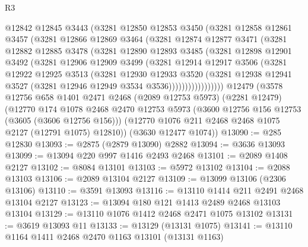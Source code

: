 \begin{lexlean}{R3}
\begin{coremodule}
            @12842
            @12845
            @3443
            (@3281
              @12850
              @12853
              @3450
              (@3281
                @12858
                @12861
                @3457
                (@3281
                  @12866
                  @12869
                  @3464
                  (@3281
                    @12874
                    @12877
                    @3471
                    (@3281
                      @12882
                      @12885
                      @3478
                      (@3281
                        @12890
                        @12893
                        @3485
                        (@3281
                          @12898
                          @12901
                          @3492
                          (@3281
                            @12906
                            @12909
                            @3499
                            (@3281
                              @12914
                              @12917
                              @3506
                              (@3281
                                @12922
                                @12925
                                @3513
                                (@3281
                                  @12930
                                  @12933
                                  @3520
                                  (@3281
                                    @12938
                                    @12941
                                    @3527
                                    (@3281 @12946 @12949 @3534 @3536)))))))))))))))))
    @12479
    (@3578
      @12756
      @658
      @1401
      @2471
      @2468
      (@2089 @12753 @5973)
      (@2281 @12479)
      (@12770
        @174
        @1078
        @2468
        @2470
        @12753
        @5973
        (@3600 @12756 @156 @12753 (@3605 (@3606 @12756 @156)))
        (@12770 @1076 @211 @2468 @2468 @1075 @2127 (@12791 @1075) @12810))
      (@3630 @12477 @1074))
@13090 := @285 @12830
@13093 := @2875 (@2879 @13090) @2882
@13094 := @3636 @13093
@13099 := @13094 @220 @997 @1416 @2493 @2468
@13101 := @2089 @1408 @2127
@13102 := @8084 @13101
@13103 := @5972 @13102
@13104 := @2088 @13103
@13106 := @2089 @13104 @2127
@13109 := @13099 @13106 (@2306 @13106)
@13110 := @3591 @13093
@13116 := @13110 @1414 @211 @2491 @2468 @13104 @2127
@13123 := @13094 @180 @121 @1413 @2489 @2468 @13103 @13104
@13129 := @13110 @1076 @1412 @2468 @2471 @1075 @13102
@13131 := @3619 @13093 @11
@13133 := @13129 (@13131 @1075)
@13141 := @13110 @1164 @1411 @2468 @2470 @1163 @13101 (@13131 @1163)

\end{coremodule}
\end{lexlean}

